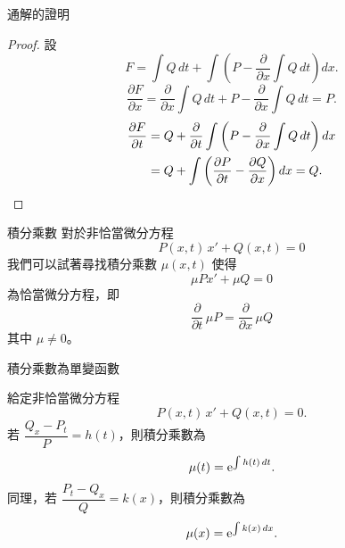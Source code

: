 \documentclass{beamer}
\newcommand  {\e}{\textup e}
\theoremstyle{remark}
\begin{document}
\begin{CJK}{UTF8}{bsmi}

\begin{frame}{通解的證明}
  \begin{proof}
    設
    \[F = \int Q\,dt + \int \left( P - \frac{\partial}{\partial x} \int Q\,dt \right) dx.\]
    \[\frac{\partial F}{\partial x} = \frac{\partial}{\partial x} \int Q\,dt + P - \frac{\partial}{\partial x} \int Q\,dt
      = P.\]
    \begin{align*}
      \frac{\partial F}{\partial t}
	&= Q + \frac{\partial}{\partial t} \int \left( P - \frac{\partial}{\partial x} \int Q\,dt \right) dx\\
	&= Q + \int \left( \frac{\partial P}{\partial t} - \frac{\partial Q}{\partial x} \right) dx = Q. \qedhere
    \end{align*}
  \end{proof}
\end{frame}

\begin{frame}{積分乘數}
  對於非恰當微分方程
  \[P(x,t)\,x' + Q(x,t) = 0\]
  我們可以試著尋找積分乘數 $\mu(x,t)$ 使得
  \[\mu Px' + \mu Q = 0\]
  為恰當微分方程，即
  \begin{equation}
    \frac{\partial}{\partial t}\,\mu P = \frac{\partial}{\partial x}\,\mu Q \label{eq:Multiplier}
  \end{equation}
  其中 $\mu \ne 0$。
\end{frame}

\begin{frame}{積分乘數為單變函數}
  \begin{theorem}
    給定非恰當微分方程
    \begin{equation}
      P(x,t)\,x' + Q(x,t) = 0. \label{eq:NonExact}
    \end{equation}
    若 $\dfrac{Q_x - P_t}{P} = h(t)$，則積分乘數為
    \begin{equation}
      \mu(t) = \e^{\int h(t)\,dt}. \label{eq:xMultiplier}
    \end{equation}
    同理，若 $\dfrac{P_t - Q_x}{Q} = k(x)$，則積分乘數為
    \[\mu(x) = \e^{\int k(x)\,dx}.\]
  \end{theorem}
\end{frame}


\end{CJK}
\end{document}
